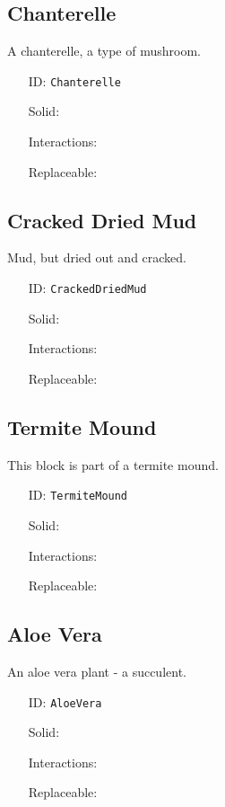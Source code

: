 \subsection{Chanterelle}\label{subsec:blocks_chanterelle}
A chanterelle, a type of mushroom.
\newline
\begin{itemize}[nosep]
\item[ID:] \texttt{Chanterelle}
\item[Solid:]  \XSolidBrush \item[Interactions:]  \XSolidBrush \item[Replaceable:]  \Checkmark \end{itemize}

\subsection{Cracked Dried Mud}\label{subsec:blocks_cracked dried mud}
Mud, but dried out and cracked.
\newline
\begin{itemize}[nosep]
\item[ID:] \texttt{CrackedDriedMud}
\item[Solid:]  \Checkmark \item[Interactions:]  \XSolidBrush \item[Replaceable:]  \XSolidBrush \end{itemize}

\subsection{Termite Mound}\label{subsec:blocks_termite mound}
This block is part of a termite mound.
\newline
\begin{itemize}[nosep]
\item[ID:] \texttt{TermiteMound}
\item[Solid:]  \Checkmark \item[Interactions:]  \Checkmark \item[Replaceable:]  \XSolidBrush \end{itemize}

\subsection{Aloe Vera}\label{subsec:blocks_aloe vera}
An aloe vera plant - a succulent.
\newline
\begin{itemize}[nosep]
\item[ID:] \texttt{AloeVera}
\item[Solid:]  \XSolidBrush \item[Interactions:]  \XSolidBrush \item[Replaceable:]  \Checkmark \end{itemize}

